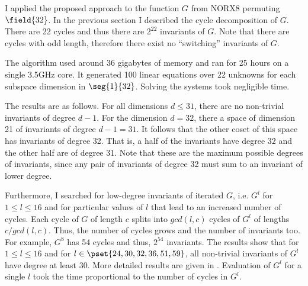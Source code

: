 I applied the proposed approach to the function $G$ from NORX8 permuting $\field{32}$. In the previous section I described the cycle decomposition of $G$. There are 22 cycles and thus there are $2^{22}$ invariants of $G$. Note that there are cycles with odd length, therefore there exist no ``switching'' invariants of $G$.

The algorithm used around 36 gigabytes of memory and ran for 25 hours on a single 3.5GHz core. It generated 100 linear equations over 22 unknowns for each subspace dimension in $\seg{1}{32}$. Solving the systems took negligible time.

The results are as follows. For all dimensions $d \le 31$, there are no non-trivial invariants of degree $d-1$. For the dimension $d = 32$, there a space of dimension 21 of invariants of degree $d-1=31$. It follows that the other coset of this space has invariants of degree 32. That is, a half of the invariants have degree $32$ and the other half are of degree 31. Note that these are the maximum possible degrees of invariants, since any pair of invariants of degree 32 must sum to an invariant of lower degree.

Furthermore, I searched for low-degree invariants of iterated $G$, i.e. $G^l$ for $1 \le l \le 16$ and for particular values of $l$ that lead to an increased number of cycles. Each cycle of $G$ of length $c$ splits into $gcd(l,c)$ cycles of $G^l$ of lengths $c/gcd(l,c)$. Thus, the number of cycles grows and the number of invariants too. For example, $G^8$ has 54 cycles and thus, $2^{54}$ invariants. The results show that for $1 \le l \le 16$ and for $l \in \pset{24,30,32,36,51,59}$, all non-trivial invariants of $G^l$ have degree at least 30. More detailed results are given in . Evaluation of $G^l$ for a single $l$ took the time proportional to the number of cycles in $G^l$.

